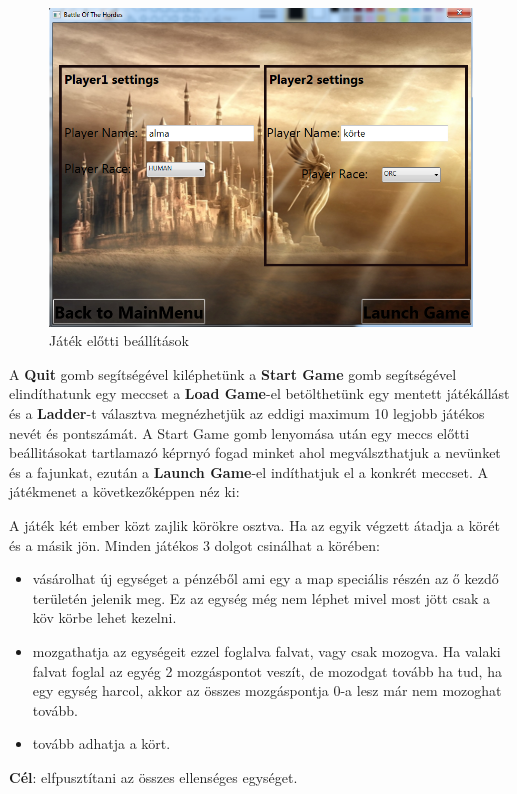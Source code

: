 \documentclass[a4paper,12pt]{report}
\begin{document}
\begin{figure}[hbtp]
\centering
\includegraphics[width=1\textwidth]{startoptions.png}
\caption{Játék előtti beállítások}
\label{fig:jeb}
\end{figure}

A {\bf Quit} gomb segítségével kiléphetünk a {\bf Start Game} gomb segítségével elindíthatunk egy meccset a {\bf Load Game}-el betölthetünk egy mentett játékállást és a {\bf Ladder}-t választva megnézhetjük az eddigi maximum 10 legjobb játékos nevét és pontszámát. A Start Game gomb lenyomása után egy meccs előtti beállitásokat tartlamazó képrnyó fogad minket ahol megválszthatjuk a nevünket és a fajunkat, ezután a {\bf Launch Game}-el indíthatjuk el a konkrét meccset. A játékmenet a következőképpen néz ki:

A játék két ember közt zajlik körökre osztva. Ha az egyik végzett átadja a körét és a másik jön. Minden játékos 3 dolgot csinálhat a körében:
\begin{itemize} 
\item vásárolhat új egységet a pénzéből ami egy a map speciális részén az ő kezdő területén jelenik meg. Ez az egység még nem léphet mivel most jött
csak a köv körbe lehet kezelni.
\item mozgathatja az egységeit ezzel foglalva falvat, vagy csak mozogva. Ha valaki falvat foglal az egyég 2 mozgáspontot veszít, de mozodgat tovább ha tud,
ha egy egység harcol, akkor az összes mozgáspontja 0-a lesz már nem mozoghat tovább.
\item tovább adhatja a kört.
\end{itemize}
{\bf Cél}: elfpusztítani az összes ellenséges egységet.
\end{document}
